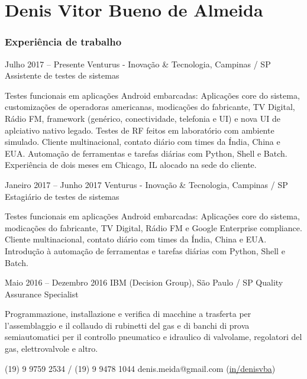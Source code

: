 \documentclass[fontsize=10pt]{tccv}
\begin{document}
\part{Denis Vitor Bueno de Almeida}

\section{Experiência de trabalho}

\begin{eventlist}

\item{Julho 2017 -- Presente}
     {Venturus - Inovação \& Tecnologia, Campinas / SP}
     {Assistente de testes de sistemas}

Testes funcionais em aplicações Android embarcadas:
Aplicações core do sistema, customizações de operadoras americanas, modicações do fabricante, TV Digital, Rádio FM, framework (genérico, conectividade, telefonia e UI) e nova UI de aplciativo nativo legado.
Testes de RF feitos em laboratório com ambiente simulado.
Cliente multinacional, contato diário com times da Índia, China e EUA.
Automação de ferramentas e tarefas diárias com Python, Shell e Batch.
Experiência de dois meses em Chicago, IL alocado na sede do cliente.

\item{Janeiro 2017 -- Junho 2017}
     {Venturus - Inovação \& Tecnologia, Campinas / SP}
     {Estagiário de testes de sistemas}

Testes funcionais em aplicações Android embarcadas:
Aplicações core do sistema, modicações do fabricante, TV Digital, Rádio FM e Google Enterprise compliance.
Cliente multinacional, contato diário com times da Índia, China e EUA.
Introdução à automação de ferramentas e tarefas diárias com Python, Shell e Batch.

\item{Maio 2016 -- Dezembro 2016}
     {IBM (Decision Group), São Paulo / SP}
     {Quality Assurance Specialist}

Programmazione, installazione e verifica di macchine a
trasferta per l'assemblaggio e il collaudo di rubinetti del gas e di
banchi di prova semiautomatici per il controllo pneumatico e idraulico
di valvolame, regolatori del gas, elettrovalvole e altro.

\end{eventlist}

    {(19) 9 9759 2534 / (19) 9 9478 1044}
    {denis.meida@gmail.com \newline (\href{https://www.linkedin/in/denisvba}{in/denisvba})}
\end{document}
